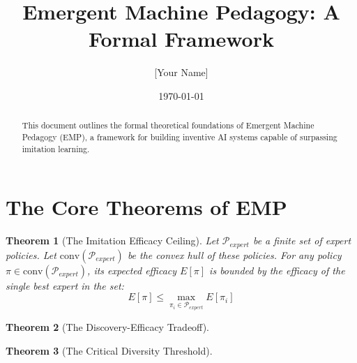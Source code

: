 \documentclass[10pt, a4paper]{article}
\title{Emergent Machine Pedagogy: A Formal Framework}
\author{[Your Name]}
\date{\today}
\newtheorem{theorem}{Theorem}[section]
\begin{document}
\maketitle

\begin{abstract}
    This document outlines the formal theoretical foundations of Emergent Machine Pedagogy (EMP), a framework for building inventive AI systems capable of surpassing imitation learning.
\end{abstract}

\section{The Core Theorems of EMP}

\begin{theorem}[The Imitation Efficacy Ceiling]
    Let \(\mathcal{P}_{expert}\) be a finite set of expert policies. Let \(\text{conv}(\mathcal{P}_{expert})\) be the convex hull of these policies. For any policy \(\pi \in \text{conv}(\mathcal{P}_{expert})\), its expected efficacy \(E[\pi]\) is bounded by the efficacy of the single best expert in the set:
    \[ E[\pi] \leq \max_{\pi_i \in \mathcal{P}_{expert}} E[\pi_i] \]
\end{theorem}

\begin{theorem}[The Discovery-Efficacy Tradeoff]
\end{theorem}

\begin{theorem}[The Critical Diversity Threshold]
\end{theorem}
\end{document}
